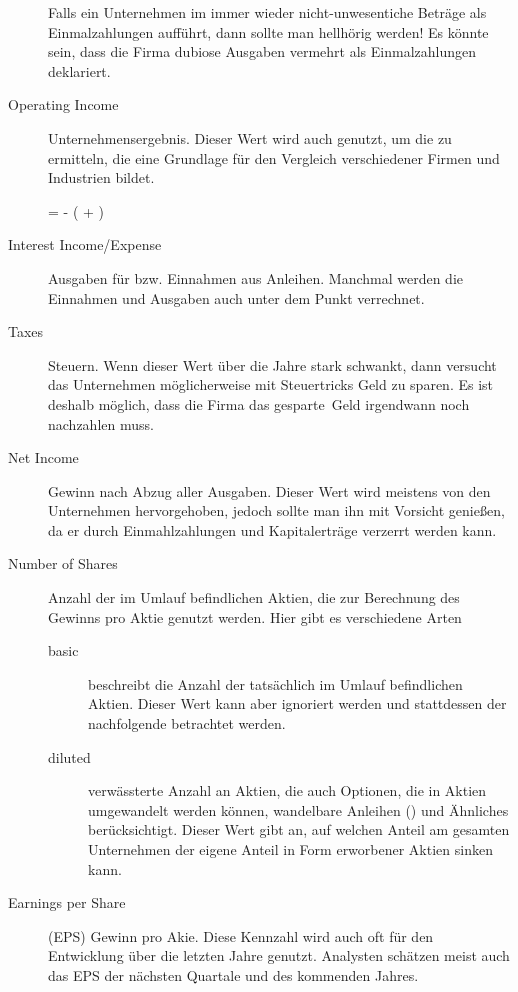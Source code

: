 \begin{description}
        Falls ein Unternehmen im  immer wieder nicht-unwesentiche Beträge als Einmalzahlungen aufführt, dann sollte man hellhörig werden!
        Es könnte sein, dass die Firma dubiose Ausgaben vermehrt als Einmalzahlungen deklariert.
    \item[Operating Income] Unternehmensergebnis. Dieser Wert wird auch genutzt, um die  zu ermitteln, die eine Grundlage für den Vergleich verschiedener Firmen und Industrien bildet.
        \begin{formel}
             =  - \left(  + \right)
        \end{formel}
    \item[Interest Income/Expense] Ausgaben für bzw. Einnahmen aus Anleihen. 
        Manchmal werden die Einnahmen und Ausgaben auch unter dem Punkt  verrechnet.
    \item[Taxes] Steuern.
        Wenn dieser Wert über die Jahre stark schwankt, dann versucht das Unternehmen möglicherweise mit Steuertricks Geld zu sparen. 
        Es ist deshalb möglich, dass die Firma das \glqq gesparte\grqq\ Geld irgendwann noch nachzahlen muss.
    \item[Net Income] Gewinn nach Abzug aller Ausgaben.
        Dieser Wert wird meistens von den Unternehmen hervorgehoben, jedoch sollte man ihn mit Vorsicht genießen, da er durch Einmahlzahlungen und Kapitalerträge verzerrt werden kann.
    \item[Number of Shares] Anzahl der im Umlauf befindlichen Aktien, die zur Berechnung des Gewinns pro Aktie genutzt werden.
        Hier gibt es verschiedene Arten
        \begin{description}
            \item[basic] beschreibt die Anzahl der tatsächlich im Umlauf befindlichen Aktien. Dieser Wert kann aber ignoriert werden und stattdessen der nachfolgende betrachtet werden.
            \item[diluted] verwässterte Anzahl an Aktien, die auch Optionen, die in Aktien umgewandelt werden können, wandelbare Anleihen () und Ähnliches berücksichtigt.
                Dieser Wert gibt an, auf welchen Anteil am gesamten Unternehmen der eigene Anteil in Form erworbener Aktien sinken kann. 
        \end{description}
    \item[Earnings per Share] (EPS) Gewinn pro Akie. Diese Kennzahl wird auch oft für den Entwicklung über die letzten Jahre genutzt. 
        Analysten schätzen meist auch das EPS der nächsten Quartale und des kommenden Jahres.  
\end{description}


